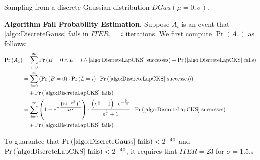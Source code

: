 \begin{algorithm}[tbh!]
    \centering
    \caption{Sampling from a discrete Gaussian distribution $ DGau \left(\mu=0,\sigma\right)$.}
    \label{algo:DiscreteGauss}
\end{algorithm}
\FloatBarrier

\textbf{Algorithm Fail Probability Estimation. }
Suppose $A_i$ is an event that \autoref{algo:DiscreteGauss} fails in $ITER_1=i$ iterations.
We first compute $\Pr\left(A_1\right) $ as follows:
\begin{equation}
    \begin{split}
        \Pr\left(A_1\right) &=\sum_{i = 0}^{\infty}  \Pr\left( B= 0 \land L=i \land \autoref{algo:DiscreteLapCKS}  \text{ successes}\right) + \Pr\left(\autoref{algo:DiscreteLapCKS}  \text{ fails}\right) \\
        &= \sum_{i = 0}^{\infty}  \left(\Pr\left( B= 0 \right) \cdot \Pr\left( L=i \right)\cdot \Pr\left(  \autoref{algo:DiscreteLapCKS}  \text{ successes}\right)\right) \\
        & \quad + \Pr\left(\autoref{algo:DiscreteLapCKS}  \text{ fails}\right) \\
        &=\sum_{i = 0}^{\infty} \left(1-e^{-\frac{\left(\left\lvert i\right\rvert-\frac{\sigma^2}{t}\right)^2  }{2\sigma^2}}\right)  \cdot \frac{\left(e^{\frac{1}{t}}-1\right) \cdot  e^{-\frac{\left\lvert i\right\rvert }{d}}}{e^{\frac{1}{t}}+1} \cdot \Pr\left(\autoref{algo:DiscreteLapCKS} \text{ successes}\right) \\
        &\quad + \Pr\left(\autoref{algo:DiscreteLapCKS} \text{ fails}\right) \\
    \end{split}
\end{equation}

To guarantee that $\Pr\left( \autoref{algo:DiscreteGauss} \text{ fails} \right) <2^{-40}$ and $\Pr\left( \autoref{algo:DiscreteLapCKS}  \text{ fails} \right) <2^{-40}$, it requires that $ITER=23$ for $\sigma =1.5$.s

